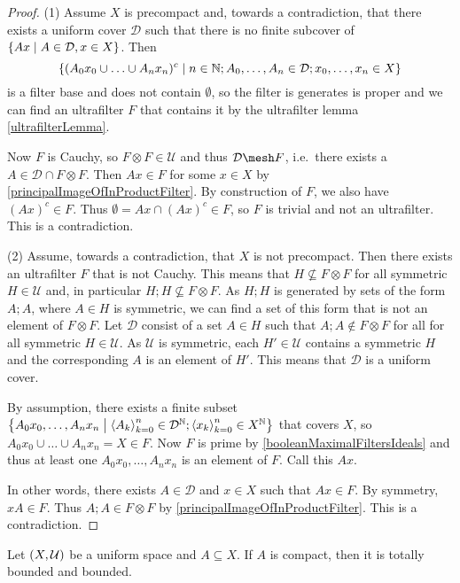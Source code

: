 \begin{proof}
(1) Assume $X$ is precompact and, towards a contradiction, that there exists a uniform cover $\mathcal{D}$ such that there is no finite subcover of $\setbuilder{Ax}{A\in \mathcal{D}, x\in X}$. Then
\[ \setbuilder{(A_0x_0\cup \ldots \cup A_nx_n)^c}{n\in \N; A_0,\ldots, A_n \in \mathcal{D}; x_0, \ldots, x_n\in X} \]
is a filter base and does not contain $\emptyset$, so the filter is generates is proper and we can find an ultrafilter $F$ that contains it by the ultrafilter lemma \ref{ultrafilterLemma}.

Now $F$ is Cauchy, so $F\otimes F\in \mathcal{U}$ and thus $\mathcal{D}\mesh F$, i.e.\ there exists a $A\in \mathcal{D}\cap F\otimes F$. Then $Ax\in F$ for some $x\in X$ by \ref{principalImageOfInProductFilter}. By construction of $F$, we also have $(Ax)^c\in F$. Thus $\emptyset =  Ax \cap (Ax)^c \in F$, so $F$ is trivial and not an ultrafilter. This is a contradiction.

(2) Assume, towards a contradiction, that $X$ is not precompact. Then there exists an ultrafilter $F$ that is not Cauchy. This means that $H \not\subseteq F\otimes F$ for all symmetric $H\in\mathcal{U}$ and, in particular $H;H \not\subseteq F\otimes F$. As $H;H$ is generated by sets of the form $A;A$, where $A\in H$ is symmetric, we can find a set of this form that is not an element of $F\otimes F$. Let $\mathcal{D}$ consist of a set $A\in H$ such that $A;A\notin F\otimes F$ for all for all symmetric $H\in \mathcal{U}$. As $\mathcal{U}$ is symmetric, each $H'\in \mathcal{U}$ contains a symmetric $H$ and the corresponding $A$ is an element of $H'$. This means that $\mathcal{D}$ is a uniform cover.

By assumption, there exists a finite subset $\setbuilder{A_0x_0, \ldots, A_nx_n}{\seq{A_k}_{k=0}^n\in \mathcal{D}^\N; \seq{x_k}_{k=0}^n \in X^\N}$ that covers $X$, so $A_0x_0 \cup \ldots \cup A_nx_n = X \in F$. Now $F$ is prime by \ref{booleanMaximalFiltersIdeals} and thus at least one $A_0x_0, \ldots, A_nx_n$ is an element of $F$. Call this $Ax$.

In other words, there exists $A\in \mathcal{D}$ and $x\in X$ such that $Ax \in F$. By symmetry, $xA\in F$. Thus $A;A\in F\otimes F$ by \ref{principalImageOfInProductFilter}. This is a contradiction.
\end{proof}
\begin{corollary} \label{compactImpliesBounded}
Let $\sSet{X,\mathcal{U}}$ be a uniform space and $A\subseteq X$. If $A$ is compact, then it is totally bounded and bounded.
\end{corollary}

